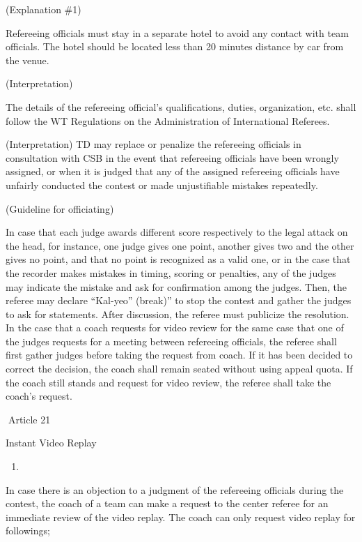 \documentclass[
]{report}
\providecommand{\tightlist}{%
  \setlength{\itemsep}{0pt}\setlength{\parskip}{0pt}}
\renewcommand{\labelenumi}{\arabic{enumi}}
\begin{document}
(Explanation \#1)

Refereeing officials must stay in a separate hotel to avoid any contact
with team officials. The hotel should be located less than 20 minutes
distance by car from the venue.

(Interpretation)

The details of the refereeing official's qualifications, duties,
organization, etc. shall follow the WT Regulations on the Administration
of International Referees.

(Interpretation) TD may replace or penalize the refereeing officials in
consultation with CSB in the event that refereeing officials have been
wrongly assigned, or when it is judged that any of the assigned
refereeing officials have unfairly conducted the contest or made
unjustifiable mistakes repeatedly.

(Guideline for officiating)

In case that each judge awards different score respectively to the legal
attack on the head, for instance, one judge gives one point, another
gives two and the other gives no point, and that no point is recognized
as a valid one, or in the case that the recorder makes mistakes in
timing, scoring or penalties, any of the judges may indicate the mistake
and ask for confirmation among the judges. Then, the referee may declare
``Kal-yeo'' (break)'' to stop the contest and gather the judges to ask
for statements. After discussion, the referee must publicize the
resolution. In the case that a coach requests for video review for the
same case that one of the judges requests for a meeting between
refereeing officials, the referee shall first gather judges before
taking the request from coach. If it has been decided to correct the
decision, the coach shall remain seated without using appeal quota. If
the coach still stands and request for video review, the referee shall
take the coach's request.

Article 21

Instant Video Replay

\begin{enumerate}
\def\labelenumi{\arabic{enumi}.}
\tightlist
\item
\end{enumerate}

In case there is an objection to a judgment of the refereeing officials
during the contest, the coach of a team can make a request to the center
referee for an immediate review of the video replay. The coach can only
request video replay for followings;
\end{document}
